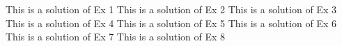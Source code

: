 \documentclass{book}
\begin{document}
    \begin{multicols}{2}
        \begin{Answer}[ref={EX21}]
            \Question 
            \begin{tasks}
                \task This is a solution of Ex 1
                \task This is a solution of Ex 2 
                \task This is a solution of Ex 3 
                \task This is a solution of Ex 4 
                \task This is a solution of Ex 5 
                \task This is a solution of Ex 6 
                \task This is a solution of Ex 7 
                \task This is a solution of Ex 8 
            \end{tasks}
        \end{Answer}
    \end{multicols}
    \newpage        
\end{document}
